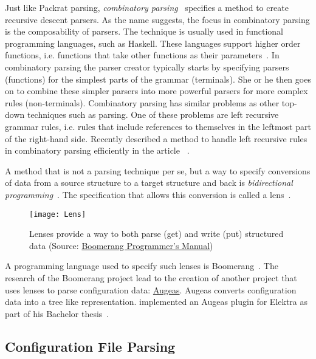 Just like Packrat parsing, \emph{combinatory parsing}~\cite{frost1992constructing, hutton1992higher} specifies a method to create recursive descent parsers. As the name suggests, the focus in combinatory parsing is the composability of parsers. The technique is usually used in functional programming languages, such as Haskell. These languages support higher order functions, i.e. functions that take other functions as their parameters~\cite[p. 564]{grune2008parsing}. In combinatory parsing the parser creator typically starts by specifying parsers (functions) for the simplest parts of the grammar (terminals). She or he then goes on to combine these simpler parsers into more powerful parsers for more complex rules (non-terminals). Combinatory parsing has similar problems as other top-down techniques such as  parsing. One of these problems are left recursive grammar rules, i.e. rules that include references to themselves in the leftmost part of the right-hand side. Recently \citeauthor{frost2007modular} described a method to handle left recursive rules in combinatory parsing efficiently in the article ~\cite{frost2007modular}.

A method that is not a parsing technique per se, but a way to specify conversions of data from a source structure to a target structure and back is \emph{bidirectional programming}~\cite{foster2005combinators, bohannon2006relational}. The specification that allows this conversion is called a lens~\cite{foster2005combinators}.

\begin{figure}[H]
  \centering
    \texttt{[image: Lens]}
  \caption{Lenses provide a way to both parse (get) and write (put) structured data \newline (Source: \href{http://www.seas.upenn.edu/~harmony/manual.pdf}{Boomerang Programmer’s Manual})}
\end{figure}

A programming language used to specify such lenses is Boomerang~\cite{bohannon2008boomerang}. The research of the Boomerang project lead to the creation of another project that uses lenses to parse configuration data: \href{http://augeas.net}{Augeas}. Augeas converts configuration data into a tree like representation. \citeauthor{berlakovich2016universal} implemented an Augeas plugin for Elektra as part of his Bachelor thesis~\cite{berlakovich2016universal}.

\subsection{Configuration File Parsing}
\label{sec:configuration_file_parsing}

